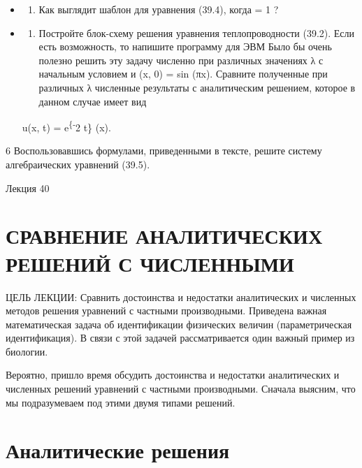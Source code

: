 \documentclass[
  ukrainian,
]{article}
\providecommand{\tightlist}{%
  \setlength{\itemsep}{0pt}\setlength{\parskip}{0pt}}
\begin{document}
\begin{itemize}
\item
  \begin{enumerate}
  \def\labelenumi{\arabic{enumi}.}
  \setcounter{enumi}{3}
  \tightlist
  \item
    Как выглядит шаблон для уравнения (39.4), когда \lambda = 1 ?
  \end{enumerate}
\item
  \begin{enumerate}
  \def\labelenumi{\arabic{enumi}.}
  \setcounter{enumi}{4}
  \tightlist
  \item
    Постройте блок-схему решения уравнения теплопроводности (39.2). Если
    есть возможность, то напишите программу для ЭВМ Было бы очень
    полезно решить эту задачу численно при различных значениях λ с
    начальным условием и (x, 0) = sin (πx). Сравните полученные при
    различных λ численные результаты с аналитическим решением, которое в
    данном случае имеет вид
  \end{enumerate}

  u(x, t) = e\textsuperscript{\{-\pi}2 t\} \sin(\pi x).
\end{itemize}

6 Воспользовавшись формулами, приведенными в тексте, решите систему
алгебраических уравнений (39.5).

Лекция 40

\section{СРАВНЕНИЕ АНАЛИТИЧЕСКИХ РЕШЕНИЙ С
ЧИСЛЕННЫМИ}\label{ux441ux440ux430ux432ux43dux435ux43dux438ux435-ux430ux43dux430ux43bux438ux442ux438ux447ux435ux441ux43aux438ux445-ux440ux435ux448ux435ux43dux438ux439-ux441-ux447ux438ux441ux43bux435ux43dux43dux44bux43cux438}

ЦЕЛЬ ЛЕКЦИИ: Сравнить достоинства и недостатки аналитических и численных
методов решения уравнений с частными производными. Приведена важная
математическая задача об идентификации физических величин
(параметрическая идентификация). В связи с этой задачей рассматривается
один важный пример из биологии.

Вероятно, пришло время обсудить достоинства и недостатки аналитических и
численных решений уравнений с частными производными. Сначала выясним,
что мы подразумеваем под этими двумя типами решений.

\section{Аналитические
решения}\label{ux430ux43dux430ux43bux438ux442ux438ux447ux435ux441ux43aux438ux435-ux440ux435ux448ux435ux43dux438ux44f}
\end{document}
